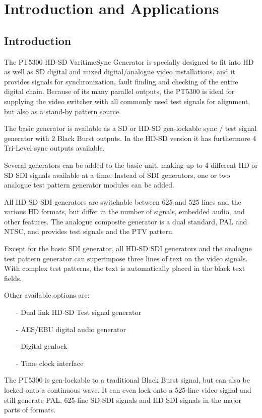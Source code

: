 \section{Introduction and Applications}
\label{cha:Introduction and Applications}
\subsection{Introduction}
The PT5300 HD-SD Varitime\TM Sync Generator is specially designed to fit into HD as well as SD digital and mixed digital/analogue video installations, and it provides signals for synchronization, fault finding and checking of the entire digital chain. Because of its many parallel outputs, the PT5300 is ideal for supplying the video switcher with all commonly used test signals for alignment, but also as a stand-by pattern source.

The basic generator is available as a SD or HD-SD gen-lockable sync / test signal generator with 2 Black Burst outputs. In the HD-SD version it has furthermore 4 Tri-Level sync outputs available. 

Several generators can be added to the basic unit, making up to 4 different HD or SD SDI signals available at a time. Instead of SDI generators, one or two analogue test pattern generator modules can be added.

All HD-SD SDI generators are switchable between 625 and 525 lines and the various HD formats, but differ in the number of signals, embedded audio, and other features. The analogue composite generator is a dual standard, PAL and NTSC, and provides test signals and the PTV pattern.

Except for the basic SDI generator, all HD-SD SDI generators and the analogue test pattern generator can superimpose three lines of text on the video signals. With complex test patterns, the text is automatically placed in the black text fields.

Other available options are:
\begin{itemize}
	\item[-] Dual link HD-SD Test signal generator
	\item[-] AES/EBU digital audio generator
	\item[-] Digital genlock
	\item[-] Time clock interface
\end{itemize}

The PT5300 is gen-lockable to a traditional Black Burst signal, but can also be locked onto a continuous wave. It can even lock onto a 525-line video signal and still generate PAL, 625-line SD-SDI signals and HD SDI signals in the major parts of formats.

